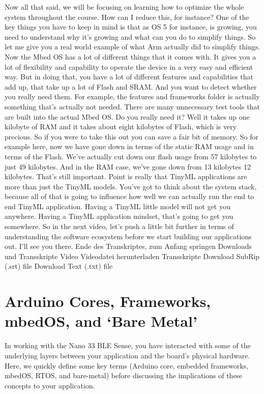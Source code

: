 Now all that said, we will be focusing on learning how to optimize
the whole system throughout the course.
How can I reduce this, for instance?
One of the key things you have to keep in mind is that as OS 5 for instance,
is growing, you need to understand why it's growing
and what can you do to simplify things.
So let me give you a real world example of what Arm actually
did to simplify things.
Now the Mbed OS has a lot of different things that it comes with.
It gives you a lot of flexibility and capability
to operate the device in a very easy and efficient way.
But in doing that, you have a lot of different features and capabilities
that add up, that take up a lot of Flash and SRAM.
And you want to detect whether you really need them.
For example, the features and frameworks folder
is actually something that's actually not needed.
There are many unnecessary test tools that are built into the actual Mbed OS.
Do you really need it?
Well it takes up one kilobyte of RAM and it takes about eight kilobytes
of Flash, which is very precious.
So if you were to take this out you can save a fair bit of memory.
So for example here, now we have gone down in terms of the static RAM usage
and in terms of the Flash.
We've actually cut down our flash usage from 57 kilobytes to just 49 kilobytes.
And in the RAM case, we've gone down from 13 kilobytes 12 kilobytes.
That's still important.
Point is really that TinyML applications are more than just the TinyML models.
You've got to think about the system stack, because all of that
is going to influence how well we can actually
run the end to end TinyML application.
Having a TinyML little model will not get you anywhere.
Having a TinyML application mindset, that's going to get you somewhere.
So in the next video, let's push a little bit
further in terms of understanding the software ecosystem
before we start building our applications out.
I'll see you there.
Ende des Transkriptes, zum Anfang springen
Downloads und Transskripte
Video
Videodatei herunterladen
Transskripte
Download SubRip (.srt) file
Download Text (.txt) file 

\section{Arduino Cores, Frameworks, mbedOS, and ‘Bare Metal’}

In working with the Nano 33 BLE Sense, you have interacted with some of the underlying layers between your application and the board’s physical hardware. Here, we quickly define some key terms (Arduino core, embedded frameworks, mbedOS, RTOS, and bare-metal) before discussing the implications of these concepts to your application.

